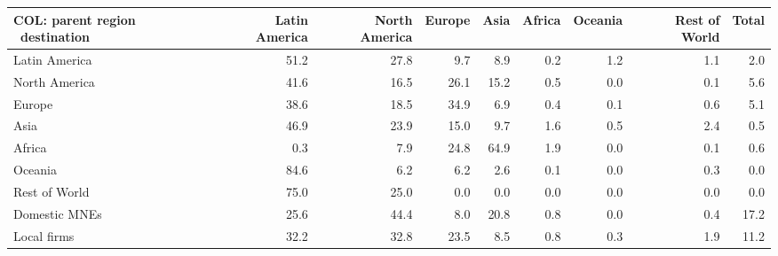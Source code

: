 \begin{tabular}{lrrrrrrrr}
\toprule
COL: parent region \ destination & Latin America & North America & Europe & Asia & Africa & Oceania & Rest of World & Total \\
\midrule
Latin America & 51.2 & 27.8 & 9.7 & 8.9 & 0.2 & 1.2 & 1.1 & 2.0 \\
North America & 41.6 & 16.5 & 26.1 & 15.2 & 0.5 & 0.0 & 0.1 & 5.6 \\
Europe & 38.6 & 18.5 & 34.9 & 6.9 & 0.4 & 0.1 & 0.6 & 5.1 \\
Asia & 46.9 & 23.9 & 15.0 & 9.7 & 1.6 & 0.5 & 2.4 & 0.5 \\
Africa & 0.3 & 7.9 & 24.8 & 64.9 & 1.9 & 0.0 & 0.1 & 0.6 \\
Oceania & 84.6 & 6.2 & 6.2 & 2.6 & 0.1 & 0.0 & 0.3 & 0.0 \\
Rest of World & 75.0 & 25.0 & 0.0 & 0.0 & 0.0 & 0.0 & 0.0 & 0.0 \\
Domestic MNEs & 25.6 & 44.4 & 8.0 & 20.8 & 0.8 & 0.0 & 0.4 & 17.2 \\
Local firms & 32.2 & 32.8 & 23.5 & 8.5 & 0.8 & 0.3 & 1.9 & 11.2 \\
\bottomrule
\end{tabular}

